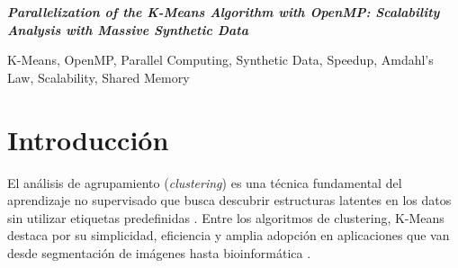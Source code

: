 \documentclass[conference]{IEEEtran}
\begin{document}
\vfill

{\centering\normalsize\textbf{\textit{Parallelization of the K-Means Algorithm
with OpenMP: Scalability Analysis with Massive Synthetic Data}}\par}
\vspace{2pt}

\renewcommand{\abstractname}{Abstract}
\begin{abstract}
The K-Means algorithm is one of the most widely used unsupervised clustering
techniques in machine learning and data analysis.
Its assignment phase, which computes the distance from each point to every
centroid, is the computational bottleneck and scales linearly with the dataset
size.
In this work K-Means is implemented in the C language, parallelizing the
assignment phase with OpenMP on a shared-memory system.
Unlike small didactic datasets (such as Iris, with 150 instances), where thread
\emph{overhead} prevents any observable speedup, here Gaussian synthetic data
generated with the Box-Muller transform are used, with sizes $N$ ranging from
$10^4$ to $10^6$ points, $D{=}16$ dimensions and $K{=}10$ clusters.
The results show a \emph{speedup} of up to $\sim 2.85\times$ with 4 threads for
$N{=}10^6$, in agreement with the prediction of Amdahl's Law for a parallel
fraction $P \approx 0.91$.
The \emph{parallelization threshold} is identified empirically: the problem size
above which parallelization becomes beneficial.
\end{abstract}
\renewcommand{\IEEEkeywordsname}{Keywords}
\begin{IEEEkeywords}
K-Means, OpenMP, Parallel Computing, Synthetic Data, Speedup, Amdahl's Law,
Scalability, Shared Memory
\end{IEEEkeywords}

\vfill
\newpage

\section{Introducci\'on}

El an\'alisis de agrupamiento (\emph{clustering}) es una t\'ecnica fundamental
del aprendizaje no supervisado que busca descubrir estructuras latentes en los
datos sin utilizar etiquetas predefinidas \cite{jain2010}.
Entre los algoritmos de clustering, K-Means destaca por su simplicidad,
eficiencia y amplia adopci\'on en aplicaciones que van desde segmentaci\'on
de im\'agenes hasta bioinform\'atica \cite{macqueen1967}.
\end{document}
